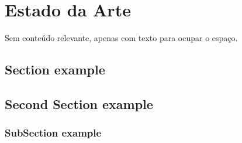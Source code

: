 \chapter{Estado da Arte}\label{chap:stat}

Sem conteúdo relevante, apenas com texto para ocupar o espaço.

\section{Section example}
\lipsum[1-6]
\section{Second Section example}
\subsection{SubSection example}
\lipsum[7-10]

